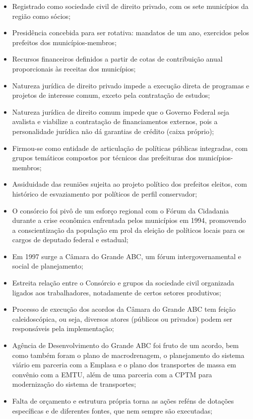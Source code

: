\documentclass[
article,			%
11pt,				%
oneside,			%
a4paper,			%
english,			%
brazil,				%
sumario=tradicional
]{abntex2}
\begin{document}
	\begin{itemize}
		\item Registrado como sociedade civil de direito privado, com os sete municípios da região como sócios;
		\item Presidência concebida para ser rotativa: mandatos de um ano, exercidos pelos prefeitos dos municípios-membros;
		\item Recursos financeiros definidos a partir de cotas de contribuição anual proporcionais às receitas dos municípios;
		\item Natureza jurídica de direito privado impede a execução direta de programas e projetos de interesse comum, exceto pela contratação de estudos;
		\item Natureza jurídica de direito comum impede que o Governo Federal seja avalista e viabilize a contratação de financiamentos externos, pois a personalidade jurídica não dá garantias de crédito (caixa próprio);
		\item Firmou-se como entidade de articulação de políticas públicas integradas, com grupos temáticos compostos por técnicos das prefeituras dos municípios-membros;
		\item Assiduidade das reuniões sujeita ao projeto político dos prefeitos eleitos, com histórico de esvaziamento por políticos de perfil conservador;
		\item O consórcio foi pivô de um esforço regional com o Fórum da Cidadania durante a crise econômica enfrentada pelos municípios em 1994, promovendo a conscientização da população em prol da eleição de políticos locais para os cargos de deputado federal e estadual;
		\item Em 1997 surge a Câmara do Grande ABC, um fórum intergovernamental e social de planejamento;
		\item Estreita relação entre o Consórcio e grupos da sociedade civil organizada ligados aos trabalhadores, notadamente de certos setores produtivos;
		\item Processo de execução dos acordos da Câmara do Grande ABC tem feição caleidoscópica, ou seja, diversos atores (públicos ou privados) podem ser responsáveis pela implementação;
		\item Agência de Desenvolvimento do Grande ABC foi fruto de um acordo, bem como também foram o plano de macrodrenagem, o planejamento do sistema viário em parceria com a Emplasa e o plano dos transportes de massa em convênio com a EMTU, além de uma parceria com a CPTM para modernização do sistema de transportes;
		\item Falta de orçamento e estrutura própria torna as ações reféns de dotações específicas e de diferentes fontes, que nem sempre são executadas;

\end{itemize}
\end{document}
